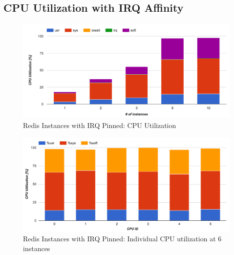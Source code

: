 \subsection{CPU Utilization with IRQ Affinity}
\begin{figure}[h]
    \includegraphics[width=\textwidth]{./res2/r_irq_cpu.png}
    \caption{Redis Instances with IRQ Pinned: CPU Utilization}
    \label{fig:r_irq_cpu}
\end{figure}
\begin{figure}[h]
    \includegraphics[width=\textwidth]{./res2/r_irq_cpu_individual.png}
    \caption{Redis Instances with IRQ Pinned: Individual CPU utilization at 6 instances}
    \label{fig:r_irq_cpu_individual}
\end{figure}




